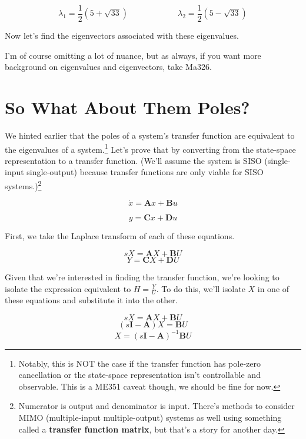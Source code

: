 \documentclass[
  letterpaper,
  DIV=11,
  numbers=noendperiod]{scrreprt}
\begin{document}
\[\lambda_1 = \frac{1}{2} \left(5+\sqrt{33} \right) \qquad \qquad \qquad \lambda_2 = \frac{1}{2} \left(5 - \sqrt{33} \right)\]

Now let's find the eigenvectors associated with these eigenvalues.

I'm of course omitting a lot of nuance, but as always, if you want more
background on eigenvalues and eigenvectors, take Ma326.

\hypertarget{so-what-about-them-poles}{%
\section{So What About Them Poles?}\label{so-what-about-them-poles}}

We hinted earlier that the poles of a system's transfer function are
equivalent to the eigenvalues of a system.\footnote{Notably, this is NOT
  the case if the transfer function has pole-zero cancellation or the
  state-space representation isn't controllable and observable. This is
  a ME351 caveat though, we should be fine for now.} Let's prove that by
converting from the state-space representation to a transfer function.
(We'll assume the system is SISO (single-input single-output) because
transfer functions are only viable for SISO systems.)\footnote{Numerator
  is output and denominator is input. There's methods to consider MIMO
  (multiple-input multiple-output) systems as well using something
  called a \textbf{transfer function matrix}, but that's a story for
  another day.}

\[{\dot{x}} = \textbf{A} {x} + \textbf{B} {u}\]

\vspace{-0.3in}

\[{y} = \textbf{C} {x} + \textbf{D} {u}\]

First, we take the Laplace transform of each of these equations.

\[sX = \textbf{A} X + \textbf{B} U\] \vspace{-0.3in}
\[Y = \textbf{C} X + \textbf{D} U\]

Given that we're interested in finding the transfer function, we're
looking to isolate the expression equivalent to \(H = \frac{Y}{U}\). To
do this, we'll isolate \(X\) in one of these equations and substitute it
into the other.

\[sX = \textbf{A} X + \textbf{B} U\] \vspace{-0.3in}
\[(s\textbf{I}-\textbf{A}) X = \textbf{B} U\] \vspace{-0.3in}
\[X = (s\textbf{I}-\textbf{A})^{-1} \textbf{B} U\]
\end{document}

